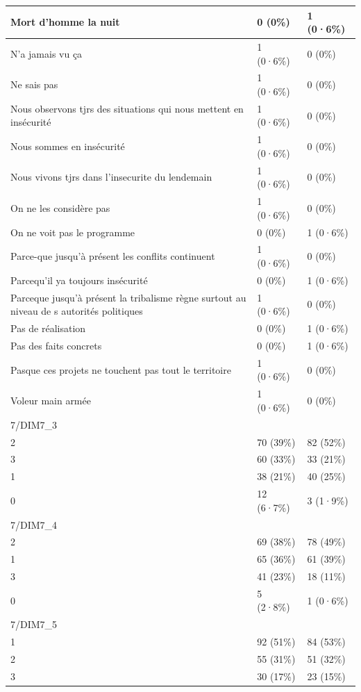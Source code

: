 \documentclass[
]{book}
\begin{document}
\begin{tabular}{l|l|l}
\hline
Mort d'homme la nuit & 0 (0\%) & 1 (0·6\%)\\
\hline
N'a jamais vu ça & 1 (0·6\%) & 0 (0\%)\\
\hline
Ne sais pas & 1 (0·6\%) & 0 (0\%)\\
\hline
Nous observons tjrs des situations qui nous mettent en insécurité & 1 (0·6\%) & 0 (0\%)\\
\hline
Nous sommes en insécurité & 1 (0·6\%) & 0 (0\%)\\
\hline
Nous vivons tjrs dans l'insecurite du lendemain & 1 (0·6\%) & 0 (0\%)\\
\hline
On ne les considère pas & 1 (0·6\%) & 0 (0\%)\\
\hline
On ne voit pas le programme & 0 (0\%) & 1 (0·6\%)\\
\hline
Parce-que jusqu'à présent les conflits continuent & 1 (0·6\%) & 0 (0\%)\\
\hline
Parcequ'il ya toujours insécurité & 0 (0\%) & 1 (0·6\%)\\
\hline
Parceque jusqu'à présent la tribalisme règne surtout au niveau de s autorités politiques & 1 (0·6\%) & 0 (0\%)\\
\hline
Pas de réalisation & 0 (0\%) & 1 (0·6\%)\\
\hline
Pas des faits concrets & 0 (0\%) & 1 (0·6\%)\\
\hline
Pasque ces projets ne touchent pas tout le territoire & 1 (0·6\%) & 0 (0\%)\\
\hline
Voleur main armée & 1 (0·6\%) & 0 (0\%)\\
\hline
7/DIM7\_3 &  & \\
\hline
2 & 70 (39\%) & 82 (52\%)\\
\hline
3 & 60 (33\%) & 33 (21\%)\\
\hline
1 & 38 (21\%) & 40 (25\%)\\
\hline
0 & 12 (6·7\%) & 3 (1·9\%)\\
\hline
7/DIM7\_4 &  & \\
\hline
2 & 69 (38\%) & 78 (49\%)\\
\hline
1 & 65 (36\%) & 61 (39\%)\\
\hline
3 & 41 (23\%) & 18 (11\%)\\
\hline
0 & 5 (2·8\%) & 1 (0·6\%)\\
\hline
7/DIM7\_5 &  & \\
\hline
1 & 92 (51\%) & 84 (53\%)\\
\hline
2 & 55 (31\%) & 51 (32\%)\\
\hline
3 & 30 (17\%) & 23 (15\%)\\

\end{tabular}
\end{document}
